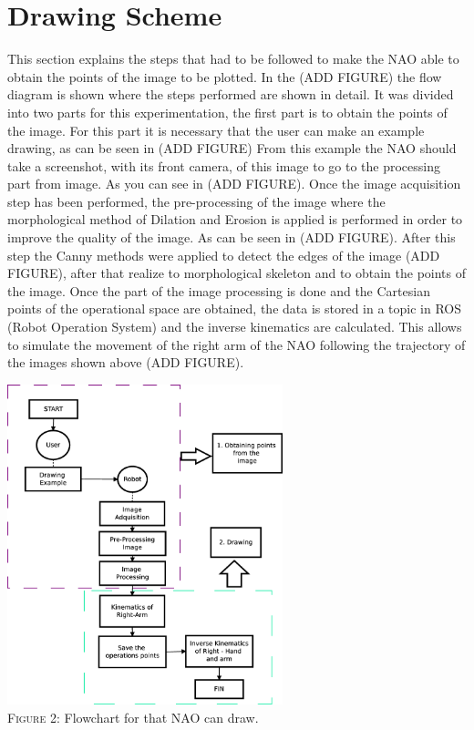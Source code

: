 \documentclass[conference]{IEEEtran}
\begin{document}
\section{Drawing Scheme}
This section explains the steps that had to be followed to make the NAO able to obtain the points of the image to be plotted. In the (ADD FIGURE) the flow diagram is shown where the steps performed are shown in detail.
It was divided into two parts for this experimentation, the first part is to obtain the points of the image. For this part it is necessary that the user can make an example drawing, as can be seen in (ADD FIGURE) From this example the NAO should take a screenshot, with its front camera, of this image to go to the processing part from image. As you can see in (ADD FIGURE). Once the image acquisition step has been performed, the pre-processing of the image where the morphological method of Dilation and Erosion is applied is performed in order to improve the quality of the image. As can be seen in (ADD FIGURE). After this step the Canny methods were applied to detect the edges of the image (ADD FIGURE), after that realize to morphological skeleton and to obtain the points of the image. Once the part of the image processing is done and the Cartesian points of the operational space are obtained, the data is stored in a topic in ROS (Robot Operation System) and the inverse kinematics are calculated. This allows to simulate the movement of the right arm of the NAO following the trajectory of the images shown above (ADD FIGURE).

\begin{strip}
\centering
\captionsetup{font=footnotesize}
\includegraphics[width=0.6\textwidth]{flowchart.eps}\\
\textsc{Figure 2:} Flowchart for that NAO can draw.
\end{strip}
\end{document}
